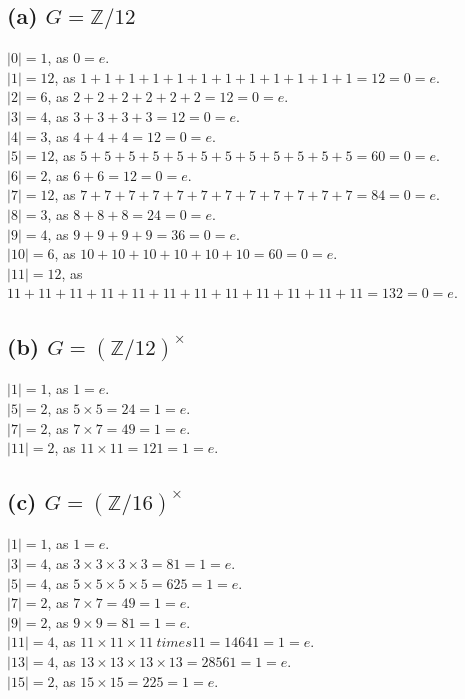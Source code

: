 \documentclass[12pt,letterpaper]{article}
\begin{document}
\subsection*{(a) \(G = \mathbb{Z}/12\)}
\(|0| = 1\), as \(0 = e\).\\
\(|1| = 12\), as \(1 + 1 + 1 + 1 + 1 +1 +1 +1 +1 +1 +1 +1 = 12 = 0 = e\).\\
\(|2| = 6\), as \(2 + 2 +2 +2+2+2 =  12 =0 = e\).\\
\(|3| = 4\), as \(3 + 3 +3 +3 = 12 = 0 =e\).\\
\(|4| = 3\), as \(4 + 4 + 4 = 12= 0 = e\). \\
\(|5| = 12\), as \(5 + 5 + 5 + 5 + 5 + 5 + 5 +5 + 5 +5 +5 +5 =60= 0 = e\). \\
\(|6| = 2\), as \(6 + 6 =12= 0 = e\). \\
\(|7| = 12\), as \(7+7+7+7+7+7+7+7+7+7+7+7 =84=  0 = e\).\\
\(|8| = 3\), as \(8+8+8 =24= 0 = e\).\\
\(|9| = 4\), as \(9 + 9 + 9 + 9 = 36 =0 = e\). \\
\(|10| = 6\), as \(10 + 10 + 10 + 10 + 10 + 10 = 60 = 0 = e\). \\
\(|11| = 12\), as \(11 + 11 + 11 + 11 + 11 + 11 + 11 + 11 + 11 + 11 + 11 + 11 = 132 = 0 = e\).
\subsection*{(b) \(G = (\mathbb{Z}/12)^{\times}\)}
\(|1| = 1\), as \(1 = e\). \\
\(|5| = 2\), as \(5 \times 5 = 24 = 1 = e\). \\
\(|7| = 2\), as \(7 \times 7 = 49 = 1 = e\). \\
\(|11| = 2\), as \(11 \times 11 = 121 = 1 = e\).
\subsection*{(c) \(G = (\mathbb{Z}/16)^{\times}\)}
\(|1| = 1\), as \(1 = e\). \\
\(|3| = 4\), as \(3 \times 3 \times 3 \times 3 = 81 = 1 = e\). \\
\(|5| = 4\), as \( 5\times 5 \times 5 \times 5 = 625 = 1 = e\). \\
\(|7| = 2\), as \(7 \times 7 = 49 =1 = e\). \\
\(|9| = 2\), as \(9 \times 9 = 81 = 1 = e\). \\
\(|11| = 4\), as \(11 \times 11 \times 11 \ times 11 = 14641 = 1 = e\). \\
\(|13| = 4\), as \(13 \times 13 \times 13 \times 13 = 28561 = 1 = e\). \\
\(|15| = 2\), as \(15 \times 15 = 225 = 1 = e\).
\end{document}

